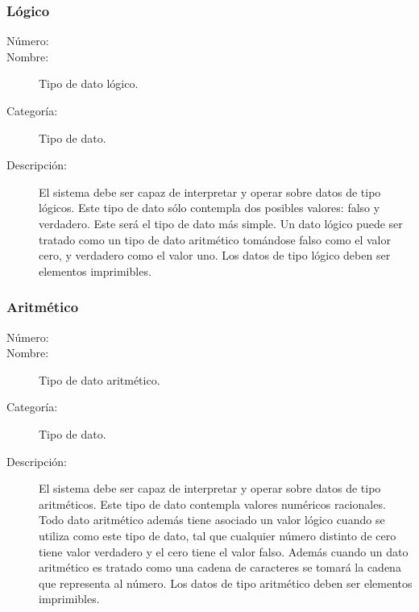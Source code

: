 \subsubsection{Lógico}
\begin{framed}
	\begin{description}
		\item [Número:] \cn
		\item [Nombre:] Tipo de dato lógico.
		\item [Categoría:] Tipo de dato.
		\item [Descripción:] El sistema debe ser capaz de interpretar y operar sobre datos de tipo lógicos. Este tipo
		de dato sólo contempla dos posibles valores: falso y verdadero. Este será el tipo de dato más simple. Un dato lógico
		puede ser tratado como un tipo de dato aritmético tomándose falso como el valor cero, y verdadero como el valor uno.
		Los datos de tipo lógico deben ser elementos imprimibles.
	\end {description}
\end{framed}
\subsubsection{Aritmético}
\begin{framed}
	\begin{description}
		\item [Número:] \cn
		\item [Nombre:] Tipo de dato aritmético.
		\item [Categoría:] Tipo de dato.
		\item [Descripción:] El sistema debe ser capaz de interpretar y operar sobre datos de tipo aritméticos. Este tipo
		de dato contempla valores numéricos racionales. Todo dato aritmético además tiene asociado un valor lógico cuando se utiliza como este
		tipo de dato, tal que cualquier número distinto de cero tiene valor verdadero y el cero tiene el valor falso. Además cuando un dato aritmético
		es tratado como una cadena de caracteres se tomará la cadena que representa al número. Los datos de tipo aritmético deben
		ser elementos imprimibles.
	\end {description}
\end{framed}

